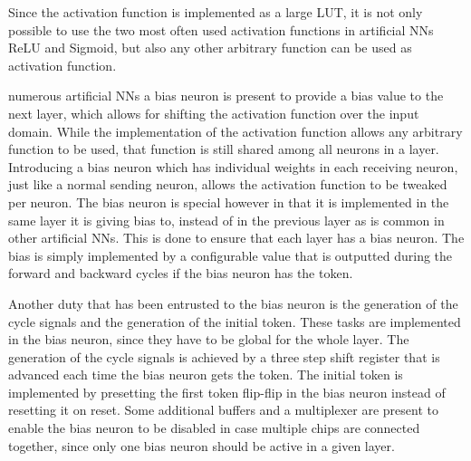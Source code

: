Since the activation function is implemented as a large \ac{LUT}, it is not only possible to use the two most often used activation functions in artificial \acp{NN} \ac{ReLU} and Sigmoid\cite{8192463}, but also any other arbitrary function can be used as activation function.

 numerous artificial \acp{NN} a bias neuron is present to provide a bias value to the next layer, which allows for shifting the activation function over the input domain. While the implementation of the activation function allows any arbitrary function to be used, that function is still shared among all neurons in a layer. Introducing a bias neuron which has individual weights in each receiving neuron, just like a normal sending neuron, allows the activation function to be tweaked per neuron. The bias neuron is special however in that it is implemented in the same layer it is giving bias to, instead of in the previous layer as is common in other artificial \acp{NN}. This is done to ensure that each layer has a bias neuron. The bias is simply implemented by a configurable value that is outputted during the forward and backward cycles if the bias neuron has the token.

Another duty that has been entrusted to the bias neuron is the generation of the cycle signals and the generation of the initial token. These tasks are implemented in the bias neuron, since they have to be global for the whole layer. The generation of the cycle signals is achieved by a three step shift register that is advanced each time the bias neuron gets the token. The initial token is implemented by presetting the first token flip-flip in the bias neuron instead of resetting it on reset. Some additional buffers and a multiplexer are present to enable the bias neuron to be disabled in case multiple chips are connected together, since only one bias neuron should be active in a given layer.
